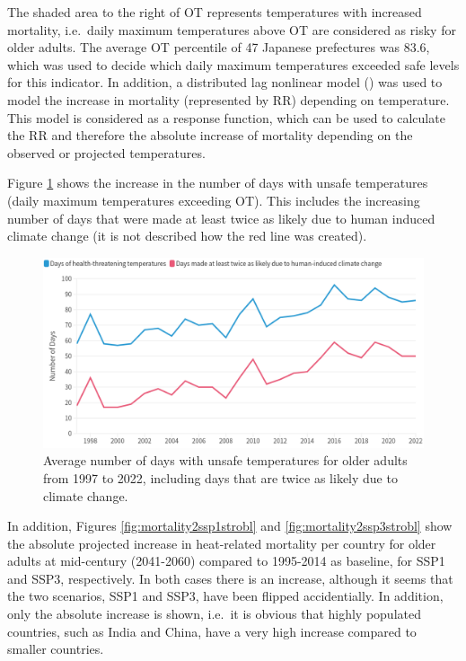 \documentclass[
]{krantz}
\begin{document}
The shaded area to the right of OT represents temperatures with increased mortality, i.e.~daily maximum temperatures above OT are considered as risky for older adults. The average OT percentile of 47 Japanese prefectures was 83.6, which was used to decide which daily maximum temperatures exceeded safe levels for this indicator. In addition, a distributed lag nonlinear model (\citet{armstrong2006}) was used to model the increase in mortality (represented by RR) depending on temperature. This model is considered as a response function, which can be used to calculate the RR and therefore the absolute increase of mortality depending on the observed or projected temperatures.

Figure \ref{fig:mortality1strobl} shows the increase in the number of days with unsafe temperatures (daily maximum temperatures exceeding OT). This includes the increasing number of days that were made at least twice as likely due to human induced climate change (it is not described how the red line was created).

\begin{figure}

{\centering \includegraphics[width=0.8\linewidth]{work/08-lancet/figures/indicator_2_1} 

}

\caption{Average number of days with unsafe temperatures for older adults from 1997 to 2022, including days that are twice as likely due to climate change.}\label{fig:mortality1strobl}
\end{figure}

In addition, Figures \ref{fig:mortality2ssp1strobl} and \ref{fig:mortality2ssp3strobl} show the absolute projected increase in heat-related mortality per country for older adults at mid-century (2041-2060) compared to 1995-2014 as baseline, for SSP1 and SSP3, respectively. In both cases there is an increase, although it seems that the two scenarios, SSP1 and SSP3, have been flipped accidentially. In addition, only the absolute increase is shown, i.e.~it is obvious that highly populated countries, such as India and China, have a very high increase compared to smaller countries.
\end{document}
